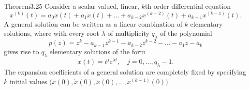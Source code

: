 \begin{res}{Theorem}{3.25}
Consider a scalar-valued, linear, $k$th order differential equation
\begin{equation}x^{(k)}(t)=a_0x(t)+a_1\dot x(t)+\dots+a_{k-2}x^{(k-2)}(t)+a_{k-1}x^{(k-1)}(t).\tag{3.95}\end{equation}
A general solution can be written as a linear combination of $k$ elementary solutions, where with every root $\lambda$ of multiplicity $q_\lambda$ of the polynomial
\begin{equation}p(z)=z^k-a_{k-1}z^{k-1}-a_{k-2}z^{k-2}-\dots-a_1z-a_0\tag{3.96}\end{equation}
gives rise to $q_\lambda$ elementary solutions of the form
\begin{equation}x(t)=t^j\mathrm e^{\lambda t},\quad j=0,\dots,q_\lambda-1.\tag{3.97}\end{equation}
The expansion coefficients of a general solution are completely fixed by specifying $k$ initial values $\bigl(x(0),\dot x(0),\ddot x(0),\dots,x^{(k-1)}(0)\bigr)$.
\end{res}
